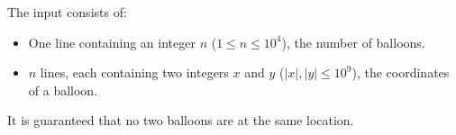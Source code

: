 
  The input consists of:
  \begin{itemize}
    \item One line containing an integer $n$ ($1 \leq n \leq 10^4$), the number of balloons.
    \item $n$ lines, each containing two integers $x$ and $y$ ($|x|, |y| \leq 10^9$), the coordinates of a balloon.
  \end{itemize}
  It is guaranteed that no two balloons are at the same location.
